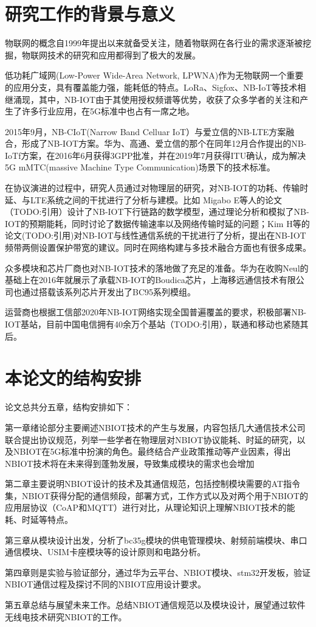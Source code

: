 \thesischapterexordium

\section{研究工作的背景与意义}

物联网的概念自1999年提出以来就备受关注，随着物联网在各行业的需求逐渐被挖掘，物联网技术的研究和应用都得到了极大的发展。


低功耗广域网(Low-Power Wide-Area Network, LPWNA)作为无物联网一个重要的应用分支，具有覆盖能力强，能耗低的特点。LoRa、Sigfox、NB-IoT等技术相继涌现，其中，NB-IOT由于其使用授权频谱等优势，收获了众多学者的关注和产生了许多行业应用，在5G标准中也占有一席之地。

2015年9月，NB-CIoT(Narrow Band Celluar IoT）与爱立信的NB-LTE方案融合，形成了NB-IOT方案。华为、高通、爱立信的那个在同年12月合作提出的NB-IoTf方案，在2016年6月获得3GPP批准，并在2019年7月获得ITU确认，成为解决5G mMTC(massive Machine Type Communication)场景下的技术标准。

在协议演进的过程中，研究人员通过对物理层的研究，对NB-IOT的功耗、传输时延、与LTE系统之间的干扰进行了分析与建模。比如 Migabo E等人的论文（TODO:引用）设计了NB-IOT下行链路的数学模型，通过理论分析和模拟了NB-IOT的预期能耗，同时讨论了数据传输速率以及网络传输时延的问题；Kim H等的论文(TODO:引用)对NB-IOT与线性通信系统的干扰进行了分析，提出在NB-IOT频带两侧设置保护带宽的建议。同时在网络构建与多技术融合方面也有很多成果。

众多模块和芯片厂商也对NB-IOT技术的落地做了充足的准备。华为在收购Neul的基础上在2016年就展示了承载NB-IOT的Boudica芯片，上海移远通信技术有限公司也通过搭载该系列芯片开发出了BC95系列模组。

运营商也根据工信部2020年NB-IOT网络实现全国普遍覆盖的要求，积极部署NB-IOT基站，目前中国电信拥有40余万个基站（TODO:引用），联通和移动也紧随其后。

\section{本论文的结构安排}

论文总共分五章，结构安排如下：

第一章绪论部分主要阐述NBIOT技术的产生与发展，内容包括几大通信技术公司联合提出协议规范，列举一些学者在物理层对NBIOT协议能耗、时延的研究，以及NBIOT在5G标准中扮演的角色。最终结合产业政策推动等产业因素，得出NBIOT技术将在未来得到蓬勃发展，导致集成模块的需求也会增加

第二章主要说明NBIOT设计的技术及其通信规范，包括控制模块需要的AT指令集，NBIOT获得分配的通信频段，部署方式，工作方式以及对两个用于NBIOT的应用层协议（CoAP和MQTT）进行对比，从理论知识上理解NBIOT技术的能耗、时延等特点。

第三章从模块设计出发，分析了bc35g模块的供电管理模块、射频前端模块、串口通信模块、USIM卡座模块等的设计原则和电路分析。

第四章则是实验与验证部分，通过华为云平台、NBIOT模块、stm32开发板，验证NBIOT通信过程及探讨不同的NBIOT应用设计要求。

第五章总结与展望未来工作。总结NBIOT通信规范以及模块设计，展望通过软件无线电技术研究NBIOT的工作。